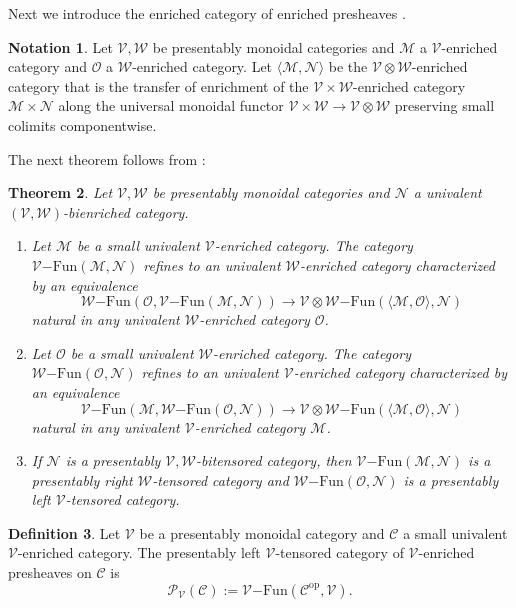 \documentclass[10pt,oneside]{article}
\numberwithin{equation}{section} %
\numberwithin{figure}{section} %
\theoremstyle{plain}
\newtheorem{theorem}{Theorem}[subsection]
\theoremstyle{definition}
\newtheorem{definition}[theorem]{Definition}
\newtheorem{notation}[theorem]{Notation}
\newcommand{\mC}{{\mathcal C}}
\newcommand{\mM}{{\mathcal M}}
\newcommand{\mN}{{\mathcal N}}
\newcommand{\mO}{{\mathcal O}}
\newcommand{\mP}{{\mathcal P}}
\newcommand{\mV}{{\mathcal V}}
\newcommand{\mW}{{\mathcal W}}
\newcommand{\op}{\mathrm{op}}
\newcommand{\ot}{\otimes}
\newcommand{\Fun}{\mathrm{Fun}}
\begin{document}
Next we introduce the enriched category of enriched presheaves \cite{heine2025equivalence}.


\begin{notation}

Let $\mV, \mW$ be presentably monoidal categories and $\mM$ a $\mV$-enriched category and $\mO$ a $\mW$-enriched category.
Let $\langle \mM, \mN \rangle $ be the $\mV \ot \mW$-enriched category that is the transfer of enrichment of the $\mV \times \mW$-enriched category $\mM \times \mN$ along the universal
monoidal functor $\mV \times \mW \to \mV \ot \mW$ preserving small colimits componentwise.
    
\end{notation}

The next theorem follows from \cite[Proposition 4.11, Theorem 4.86]{heine2024bienriched}:

\begin{theorem}\label{psinho} Let $\mV, \mW$ be presentably monoidal categories and $\mN$ a univalent $(\mV, \mW)$-bienriched category. 
\begin{enumerate}[\normalfont(1)]\setlength{\itemsep}{-2pt}
\item Let $\mM$ be a small univalent $\mV$-enriched category. The
category ${\mV\mathrm{-}\Fun}(\mM, \mN)$ refines to an univalent $\mW$-enriched category characterized by an 
equivalence
$$ \mW\mathrm{-}\Fun(\mO,{\mV\mathrm{-}\Fun}(\mM, \mN)) \to {\mV \ot \mW\mathrm{-}\Fun}(\langle\mM,\mO\rangle,\mN)$$
natural in any univalent $\mW$-enriched category $\mO$.
\item Let $\mO$ be a small univalent $\mW$-enriched category. 
The category ${\mW\mathrm{-}\Fun}(\mO, \mN)$ refines to an univalent $\mV$-enriched category characterized by an equivalence
$$ \mV\mathrm{-}\Fun(\mM,{\mW\mathrm{-}\Fun}(\mO, \mN)) \to {\mV \ot \mW\mathrm{-}\Fun}(\langle\mM,\mO\rangle,\mN) $$
natural in any univalent $\mV$-enriched category $\mM$.

\item If $\mN$ is a presentably $\mV, \mW$-bitensored category, then ${\mV\mathrm{-}\Fun}(\mM, {\mN}) $ is a presentably right $\mW$-tensored category and ${\mW\mathrm{-}\Fun}(\mO, {\mN}) $ is a presentably left $\mV$-tensored category.

\end{enumerate}

\end{theorem}
    
\begin{definition}

Let $\mV$ be a presentably monoidal category and $\mC$ a small univalent $\mV$-enriched category.
The presentably left $\mV$-tensored category of $\mV$-enriched presheaves on $\mC$ is
$$ \mP_\mV(\mC):= \mV\mathrm{-}\Fun(\mC^\op,\mV). $$
\end{definition}
\end{document}
